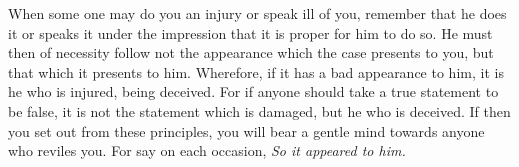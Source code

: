 When some one may  do you an injury or speak ill of  you, remember that he does
it or  speaks it under the  impression that it is  proper for him to  do so. He
must then  of necessity follow  not the appearance  which the case  presents to
you, but that which  it presents to him. Wherefore, if it  has a bad appearance
to him, it  is he who is injured,  being deceived. For if anyone  should take a
true statement to  be false, it is  not the statement which is  damaged, but he
who is  deceived. If then you  set out from  these principles, you will  bear a
gentle mind towards anyone who reviles  you. For say on each occasion, \emph{So
it appeared to him.}
